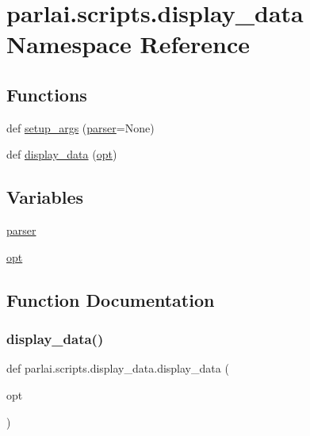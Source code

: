 \hypertarget{namespaceparlai_1_1scripts_1_1display__data}{}\section{parlai.\+scripts.\+display\+\_\+data Namespace Reference}
\label{namespaceparlai_1_1scripts_1_1display__data}
\subsection*{Functions}
\begin{DoxyCompactItemize}
\item 
def \hyperlink{namespaceparlai_1_1scripts_1_1display__data_a666e6177939b9a63961e56a1dfdc74b4}{setup\+\_\+args} (\hyperlink{namespaceparlai_1_1scripts_1_1display__data_a43745c48943804e2c6a6d8d3085e1877}{parser}=None)
\item 
def \hyperlink{namespaceparlai_1_1scripts_1_1display__data_af47c3f49de57cd1a9397b88bf36a8213}{display\+\_\+data} (\hyperlink{namespaceparlai_1_1scripts_1_1display__data_a341b3b511b1950a639f21228dd77a5c1}{opt})
\end{DoxyCompactItemize}
\subsection*{Variables}
\begin{DoxyCompactItemize}
\item 
\hyperlink{namespaceparlai_1_1scripts_1_1display__data_a43745c48943804e2c6a6d8d3085e1877}{parser}
\item 
\hyperlink{namespaceparlai_1_1scripts_1_1display__data_a341b3b511b1950a639f21228dd77a5c1}{opt}
\end{DoxyCompactItemize}


\subsection{Function Documentation}
\mbox{\label{namespaceparlai_1_1scripts_1_1display__data_af47c3f49de57cd1a9397b88bf36a8213}} 
\subsubsection{\texorpdfstring{display\+\_\+data()}{display\_data()}}
{\footnotesize\ttfamily def parlai.\+scripts.\+display\+\_\+data.\+display\+\_\+data (\begin{DoxyParamCaption}\item[{}]{opt }\end{DoxyParamCaption})}



